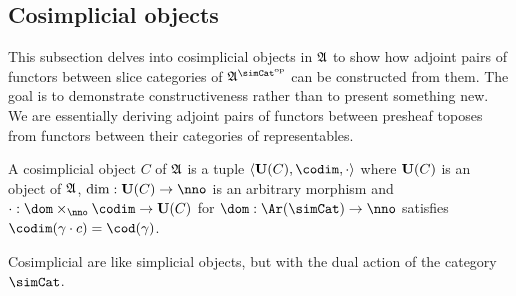 \documentclass[csh.tex]{subfiles}
\begin{document}
\subsection{Cosimplicial objects}
This subsection delves into cosimplicial objects in $\mathfrak A$ to show how adjoint pairs of functors between slice categories of $\ambient\s$ can be constructed from them. The goal is to demonstrate constructiveness rather than to present something new. We are essentially deriving adjoint pairs of functors between presheaf toposes from functors between their categories of representables.

\begin{definition} A cosimplicial object $C$ of $\mathfrak A$ is a tuple $\tuplet{\base(C),\codim,\cdot}$ where $\mathbf{U}(C)$ is an object of $\mathfrak A$, $\dim\of\base(C)\to\nno$ is an arbitrary morphism and $\cdot\of \dom\times_{\nno}\codim \to \base (C)$ for $\dom\of \Ar(\simCat)\to\nno$
 satisfies $\codim(\gamma\cdot c) = \cod(\gamma)$.
\end{definition}

Cosimplicial are like simplicial objects, but with the dual action of the category $\simCat$.
\end{document}
